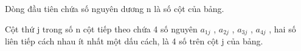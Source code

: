 Dòng đầu tiên chứa số nguyên dương n là số cột của bảng.

Cột thứ j trong số n cột tiếp theo chứa 4 số nguyên $a_{1j}$ , $a_{2j}$ , $a_{3j}$ , $a_{4j}$ , hai số liên tiếp cách nhau ít nhất một dấu cách, là 4 số trên cột j của bảng.